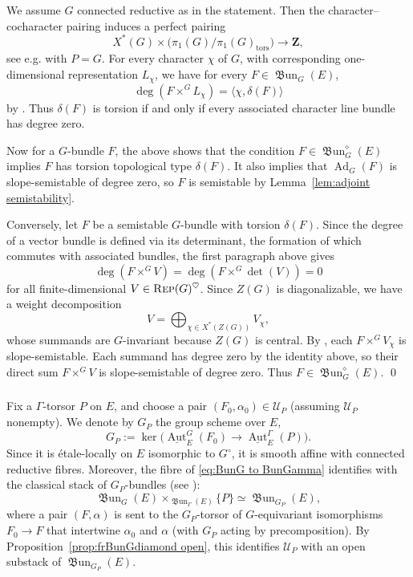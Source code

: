 \documentclass[12pt, oneside]{amsart}
\numberwithin{equation}{section}
\theoremstyle{remark}
\theoremstyle{plain}
\newcommand{\Rep}{\textsc{Rep}}
\newcommand{\UU}{\mathcal{U}}
\newcommand{\frBun}{\operatorname{\mathfrak{B}un}}
\newcommand{\uAut}{\underline{\operatorname{Aut}}}
\begin{document}
We assume $G$ connected reductive as in the statement.
Then the character--cocharacter pairing induces a perfect pairing
\[
  X^*(G) \times \bigl(\pi_1(G)/\pi_1(G)_{\mathrm{tors}}\bigr)
  \to \mathbf Z,
\]
see e.g. \cite[\S2.1.2]{Schieder} with $P=G$.
For every character $\chi$ of $G$, with corresponding one-dimensional representation $L_\chi$, we have for every $F \in \frBun_G(E)$,
\[
  \deg(F \times^G L_\chi) = \langle \chi, \delta(F) \rangle
\]
by \cite[Prop.~3.2.5(a)]{Schieder}.
Thus $\delta(F)$ is torsion if and only if every associated character line bundle has degree zero.

Now for a $G$-bundle $F$, the above shows that the condition $F \in \frBun_G^\diamond(E)$ implies $F$ has torsion topological type $\delta(F)$.
It also implies that $\operatorname{Ad}_G(F)$ is slope-semistable of degree zero, so $F$ is semistable by Lemma~\ref{lem:adjoint semistability}.

Conversely, let $F$ be a semistable $G$-bundle with torsion $\delta(F)$.
Since the degree of a vector bundle is defined via its determinant, the formation of which commutes with associated bundles, the first paragraph above gives
\[
  \deg(F \times^G V)
  = \deg(F \times^G \det(V))
  = 0
\]
for all finite-dimensional $V \in \Rep(G)^\heartsuit$.
Since $Z(G)$ is diagonalizable, we have a weight decomposition
\[
  V = \bigoplus_{\chi \in X^*(Z(G))} V_\chi,
\]
whose summands are $G$-invariant because $Z(G)$ is central.
By \cite[Cor.~2.10]{Fratila}, each $F \times^G V_\chi$ is slope-semistable.
Each summand has degree zero by the identity above, so their direct sum $F \times^G V$ is slope-semistable of degree zero.
Thus $F \in \frBun_G^\diamond(E)$.
\qed

\subsubsection{}

Fix a $\Gamma$-torsor $P$ on $E$, and choose a pair $(F_0,\alpha_0) \in \UU_P$ (assuming $\UU_P$ nonempty).
We denote by $G_P$ the group scheme over $E$,
\begin{equation}\label{eq:GP automorphisms}
  G_P := \ker\bigl(\uAut_E^G(F_0) \to \uAut_E^\Gamma(P)\bigr).
\end{equation}
Since it is \'etale-locally on $E$ isomorphic to $G^\circ$, it is smooth affine with connected reductive fibres.
Moreover, the fibre of \eqref{eq:BunG to BunGamma} identifies with the classical stack of $G_P$-bundles (see \cite[Lem.~3.3]{ORT}):
\begin{equation}\label{eq:BunGP fibre}
  \frBun_G(E) \times_{\frBun_\Gamma(E)} \{P\}
  \simeq \frBun_{G_P}(E),
\end{equation}
where a pair $(F,\alpha)$ is sent to the $G_P$-torsor of $G$-equivariant isomorphisms $F_0 \to F$ that intertwine $\alpha_0$ and $\alpha$ (with $G_P$ acting by precomposition).
By Proposition~\ref{prop:frBunGdiamond open}, this identifies $\UU_P$ with an open substack of $\frBun_{G_P}(E)$.
\end{document}
